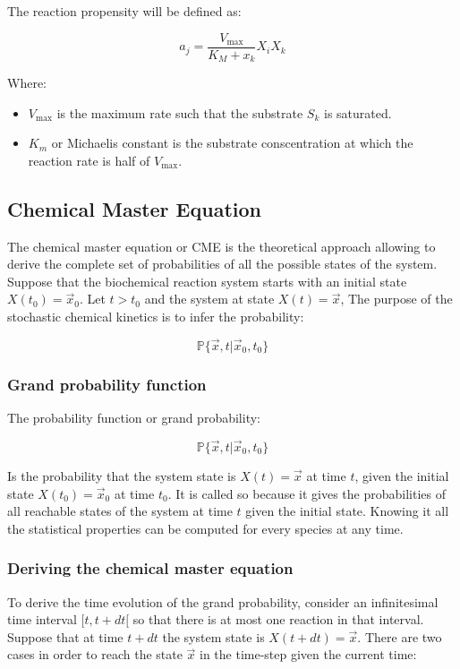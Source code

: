       The reaction propensity will be defined as:

      $$a_j = \frac{V_{\max}}{K_M+x_k}X_iX_k$$

      Where:

      \begin{multicols}{2}
        \begin{itemize}
          \item $V_{\max}$ is the maximum rate such that the substrate $S_k$ is saturated.
          \item  $K_m$  or Michaelis constant is the substrate conscentration at which the reaction rate is half of $V_{\max}$.
        \end{itemize}
      \end{multicols}

  \subsection{Chemical Master Equation}
  The chemical master equation or CME is the theoretical approach allowing to derive the complete set of probabilities of all the possible states of the system.
  Suppose that the biochemical reaction system starts with an initial state $X(t_0) = \vec{x}_0$.
  Let $t>t_0$ and the system at state $X(t)=\vec{x}$,
  The purpose of the stochastic chemical kinetics is to infer the probability:

  $$\mathbb{P}\{\vec{x},t|\vec{x}_0, t_0\}$$

    \subsubsection{Grand probability function}
    The probability function or grand probability:

    $$\mathbb{P}\{\vec{x},t|\vec{x}_0,t_0\}$$

    Is the probability that the system state is $X(t) = \vec{x}$ at time $t$, given the initial state $X(t_0) = \vec{x}_0$ at time $t_0$.
    It is called so because it gives the probabilities of all reachable states of the system at time $t$ given the initial state.
    Knowing it all the statistical properties can be computed for every species at any time.

    \subsubsection{Deriving the chemical master equation}
    To derive the time evolution of the grand probability, consider an infinitesimal time interval $[t, t+ dt[$ so that there is at most one reaction in that interval.
    Suppose that at time $t+dt$ the system state is $X(t+dt) = \vec{x}$.
    There are two cases in order to reach the state $\vec{x}$ in the time-step given the current time:

